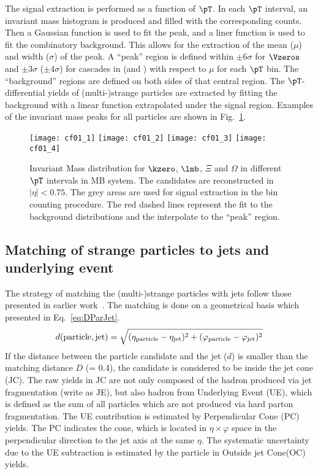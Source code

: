 \documentclass[ALICE,manyauthors]{cernphprep}
\begin{document}
The signal extraction is performed as a function of $\pT$.
In each $\pT$ interval, an invariant mass histogram is produced and filled with the corresponding counts.
Then a Gaussian function is used to fit the peak, and a liner function is used to fit the combinatory background.
This allows for the extraction of the mean ($\mu$) and width ($\sigma$) of the peak.
A ``peak'' region is defined within $\pm 6\sigma$ for $\Vzeros$ and $\pm 3\sigma$ ($\pm 4\sigma$) for cascades in \pp (and \pPb) with respect to $\mu$ for each $\pT$ bin.
The ``background'' regions are defined on both sides of that central region.
The $\pT$-differential yields of (multi-)strange particles are extracted by fitting the background with a linear function extrapolated under the signal region.
Examples of the invariant mass peaks for all particles are shown in Fig.~\ref{fig:InvM}.
\begin{figure}[!ht]
	\begin{center}
		\texttt{[image: cf01\_1]}
		\texttt{[image: cf01\_2]}
		\texttt{[image: cf01\_3]}
		\texttt{[image: cf01\_4]}
		\caption{Invariant Mass distribution for $\kzero$, $\lmb$, $\Xi$ and $\Omega$ in different $\pT$ intervals in MB \pPb system. The candidates are reconstructed in $|\eta|<0.75$.
			The grey areas are used for signal extraction in the bin counting procedure.
			The red dashed lines represent the fit to the background distributions and the interpolate to the ``peak'' region.}
		\label{fig:InvM}
	\end{center}
\end{figure}

\subsection{Matching of strange particles to jets and underlying event}%
\label{sec:ParJetMatch}

The strategy of matching the (multi-)strange particles with jets follow those presented in earlier work~\cite{V0injet}.
The matching is done on a geometrical basis which presented in Eq.~\ref{eq:DParJet}.
\begin{equation}
d(\mathrm{particle, jet}) = \sqrt{(\eta_\mathrm{particle} -\eta_{\rm jet})^{2} + (\varphi_\mathrm{particle} -\varphi_{\rm jet})^{2}}
\label{eq:DParJet}
\end{equation}
If the distance between the particle candidate and the jet ($d$) is smaller than the matching distance $D$ (= 0.4), the candidate is considered to be inside the jet cone (JC).
The raw yields in JC are not only composed of the hadron produced via jet fragmentation (write as JE), but also hadron from Underlying Event (UE), which is defined as the sum of all particles which are not produced via hard parton fragmentation.
The UE contribution is estimated by Perpendicular Cone (PC) yields.
The PC indicates the cone, which is located in $\eta \times \varphi$ space in the perpendicular direction to the jet axis at the same $\eta$.
The systematic uncertainty due to the UE subtraction is estimated by the particle in Outside jet Cone(OC) yields.
\end{document}

